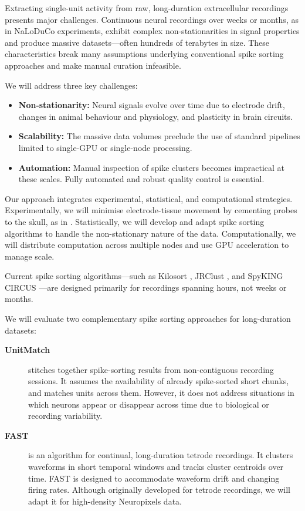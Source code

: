 Extracting single-unit activity from raw, long-duration extracellular
recordings presents major challenges. Continuous neural recordings over weeks
or months, as in NaLoDuCo experiments, exhibit complex non-stationarities in
signal properties and produce massive datasets—often hundreds of terabytes in
size. These characteristics break many assumptions underlying conventional
spike sorting approaches and make manual curation infeasible.

We will address three key challenges:

\begin{itemize}
    \item \textbf{Non-stationarity:} Neural signals evolve over time due to electrode drift, changes in animal behaviour and physiology, and plasticity in brain circuits.
    \item \textbf{Scalability:} The massive data volumes preclude the use of standard pipelines limited to single-GPU or single-node processing.
    \item \textbf{Automation:} Manual inspection of spike clusters becomes impractical at these scales. Fully automated and robust quality control is essential.
\end{itemize}

Our approach integrates experimental, statistical, and computational strategies. Experimentally, we will minimise electrode-tissue movement by cementing probes to the skull, as in \citet{schoonoverEtAl21}. Statistically, we will develop and adapt spike sorting algorithms to handle the non-stationary nature of the data. Computationally, we will distribute computation across multiple nodes and use GPU acceleration to manage scale.

\label{sec:offlineMethodsNonStationarity}

Current spike sorting algorithms—such as Kilosort \citep{pachitariuEtAl24}, JRClust \citep{chungEtAl17}, and SpyKING CIRCUS \citep{ygerEtAl18}—are designed primarily for recordings spanning hours, not weeks or months.

We will evaluate two complementary spike sorting approaches for long-duration datasets:

\begin{description}
    \item[\textbf{UnitMatch}] \citep{vanBeestEtAl24} stitches together spike-sorting results from non-contiguous recording sessions. It assumes the availability of already spike-sorted short chunks, and matches units across them. However, it does not address situations in which neurons appear or disappear across time due to biological or recording variability.
    
    \item[\textbf{FAST}] \citep{dhawaleEtAl17} is an algorithm for continual, long-duration tetrode recordings. It clusters waveforms in short temporal windows and tracks cluster centroids over time. FAST is designed to accommodate waveform drift and changing firing rates. Although originally developed for tetrode recordings, we will adapt it for high-density Neuropixels data.
\end{description}


